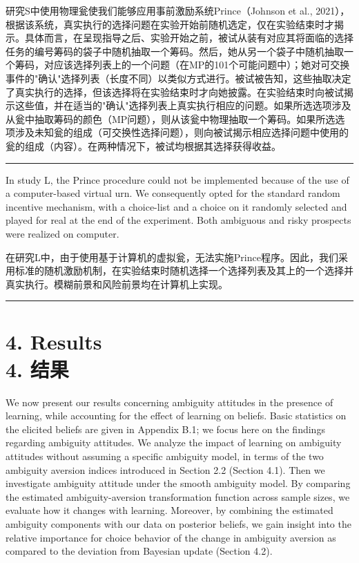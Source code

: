 \documentclass[12pt,a4paper]{article}
\newenvironment{original}
  {\par\vspace{0.5em}\noindent\color{black}\ignorespaces}
  {\par\vspace{0.3em}}
\newenvironment{translation}
  {\par\noindent\color{transblue}\ignorespaces}
  {\par\vspace{0.8em}\hrule\vspace{0.5em}}
\newcommand{\bilingualsection}[2]{%
  \section{\texorpdfstring{#1 \\[0.3em] {\large\color{transblue}#2}}{#1}}
}
\begin{document}
\begin{translation}
研究S中使用物理瓮使我们能够应用事前激励系统Prince（Johnson et al., 2021），根据该系统，真实执行的选择问题在实验开始前随机选定，仅在实验结束时才揭示。具体而言，在呈现指导之后、实验开始之前，被试从装有对应其将面临的选择任务的编号筹码的袋子中随机抽取一个筹码。然后，她从另一个袋子中随机抽取一个筹码，对应该选择列表上的一个问题（在MP的101个可能问题中）；她对可交换事件的"确认"选择列表（长度不同）以类似方式进行。被试被告知，这些抽取决定了真实执行的选择，但该选择将在实验结束时才向她披露。在实验结束时向被试揭示这些值，并在适当的"确认"选择列表上真实执行相应的问题。如果所选选项涉及从瓮中抽取筹码的颜色（MP问题），则从该瓮中物理抽取一个筹码。如果所选选项涉及未知瓮的组成（可交换性选择问题），则向被试揭示相应选择问题中使用的瓮的组成（内容）。在两种情况下，被试均根据其选择获得收益。
\end{translation}

\begin{original}
In study L, the Prince procedure could not be implemented because of the use of a computer-based virtual urn. We consequently opted for the standard random incentive mechanism, with a choice-list and a choice on it randomly selected and played for real at the end of the experiment. Both ambiguous and risky prospects were realized on computer.
\end{original}

\begin{translation}
在研究L中，由于使用基于计算机的虚拟瓮，无法实施Prince程序。因此，我们采用标准的随机激励机制，在实验结束时随机选择一个选择列表及其上的一个选择并真实执行。模糊前景和风险前景均在计算机上实现。
\end{translation}
\bilingualsection{4. Results}{4. 结果}

\begin{original}
We now present our results concerning ambiguity attitudes in the presence of learning, while accounting for the effect of learning on beliefs. Basic statistics on the elicited beliefs are given in Appendix B.1; we focus here on the findings regarding ambiguity attitudes. We analyze the impact of learning on ambiguity attitudes without assuming a specific ambiguity model, in terms of the two ambiguity aversion indices introduced in Section 2.2 (Section 4.1). Then we investigate ambiguity attitude under the smooth ambiguity model. By comparing the estimated ambiguity-aversion transformation function across sample sizes, we evaluate how it changes with learning. Moreover, by combining the estimated ambiguity components with our data on posterior beliefs, we gain insight into the relative importance for choice behavior of the change in ambiguity aversion as compared to the deviation from Bayesian update (Section 4.2).
\end{original}
\end{document}
